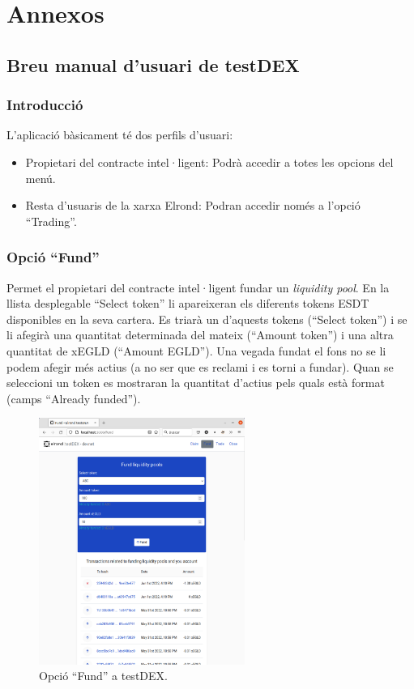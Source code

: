 \documentclass[11pt,a4paper]{article}
\begin{document}
\newpage 


\section{Annexos}\label{sec:ann}
\subsection{Breu manual d'usuari de testDEX}\label{sub:manual}
\subsubsection{Introducció}
L'aplicació bàsicament té dos perfils d'usuari:
\begin{itemize}
\item Propietari del contracte intel·ligent: Podrà accedir a totes les opcions del menú.
\item Resta d'usuaris de la xarxa Elrond: Podran accedir només a l'opció ``Trading''.
\end{itemize}

\subsubsection{Opció ``Fund''}
Permet el propietari del contracte intel·ligent fundar un \textit{liquidity pool}. En la llista desplegable ``Select token'' li apareixeran els diferents tokens ESDT disponibles en la seva cartera. Es triarà un d'aquests tokens (``Select token'') i se li afegirà una quantitat determinada del mateix (``Amount token'') i una altra quantitat de xEGLD (``Amount EGLD''). Una vegada fundat el fons no se li podem afegir més actius (a no ser que es reclami i es torni a fundar). Quan se seleccioni un token es mostraran la quantitat d'actius pels quals està format (camps ``Already funded'').
\begin{figure}[h]
\includegraphics[width=0.6\textwidth]{manualfund.png}
\centering
\caption{Opció ``Fund'' a testDEX.}\label{fig:manualfund}
\end{figure} 
\end{document}
